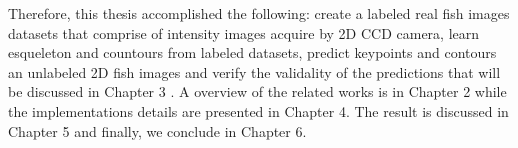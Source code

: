 Therefore, this thesis accomplished the following: create a labeled real fish images datasets
that comprise of intensity images acquire by 2D CCD camera, learn esqueleton and countours from
labeled datasets, predict keypoints and contours an unlabeled 2D fish images and verify the validality
of the predictions that will be discussed in Chapter 3 . A overview
of the related works is in Chapter 2  while the implementations details are
presented in Chapter 4. The result is discussed in Chapter 5 and finally, we conclude in Chapter 6.


	


